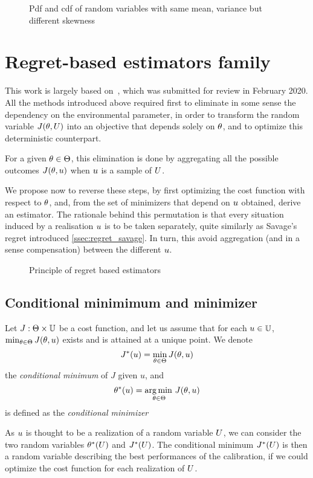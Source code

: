 \documentclass[../../Main_ManuscritThese.tex]{subfiles}
\newcommand\imgpath{/home/victor/acadwriting/Manuscrit/Text/Chapter3/img/}
\begin{document}
\begin{figure}[ht]
  \centering
  
  \caption{\label{fig:skewness_example} Pdf and cdf of random variables with same mean, variance but different skewness}
\end{figure}


\section{Regret-based estimators family}
\label{sec:rr_family}
This work is largely based on~\cite{trappler_robust_2020}, which was submitted for review in February 2020.
All the methods introduced above required first to eliminate in some sense the dependency on the environmental parameter, in order to transform the random variable $J(\theta, U)$ into an objective that depends solely on $\theta$, and to optimize this deterministic counterpart.

For a given $\theta\in\Theta$, this elimination is done by aggregating all the possible outcomes $J(\theta, u)$ when $u$ is a sample of $U$.


We propose now to reverse these steps, by first optimizing the cost function with respect to $\theta$, and,  from the set of minimizers that depend on $u$ obtained, derive an estimator. The rationale behind this permutation is that every situation induced by a realisation $u$ is to be taken separately, quite similarly as Savage's regret introduced \cref{ssec:regret_savage}.
In turn, this avoid aggregation (and in a sense compensation) between the different $u$.
\begin{figure}[ht]
  \centering
  
  \caption{\label{fig:reversing_steps} Principle of regret based estimators}
\end{figure}


\subsection{Conditional minimimum and minimizer}
\label{sec:MPE}
\begin{definition}
  Let $J: \Theta \times \mathbb{U}$ be a cost function, and let us assume that for each $u \in \mathbb{U}$, $\min_{\theta \in \Theta} J(\theta,u)$ exists and is attained at a unique point.
  We denote
  \begin{equation}
    J^*(u) = \min_{\theta \in \Theta} J(\theta,u)
  \end{equation}
  the \emph{conditional minimum} of $J$ given $u$, and
  \begin{equation}
    \theta^*(u) = \operatorname*{arg\,min \,}_{\theta\in\Theta} J(\theta, u)
  \end{equation}
 is defined as the \emph{conditional minimizer}
\end{definition}
As $u$ is thought to be a realization of a random variable $U$, we can consider the two random variables $\theta^*(U)$ and $J^*(U)$.
The conditional minimum $J^*(U)$ is then a random variable describing the best performances of the calibration, if we could optimize the cost function for each realization of $U$.
\end{document}
